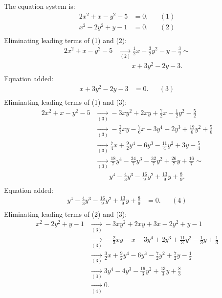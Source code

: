 {\scriptsize
The equation system is:
\begin{align*}
2x^{2}+x-y^{2}-5&= 0, &&(1)\\
x^{2}-2y^{2}+y-1&= 0. &&(2)\\
\end{align*}
Eliminating leading terms of (1) and (2):
\begin{align*}
2x^{2}+x-y^{2}-5&\underset{(2)}{\rightarrow}\frac{1}{2}x+\frac{3}{2}y^{2}-y-\frac{3}{2}
\sim \\ &\qquad x+3y^{2}-2y-3
.\\ \end{align*}
Equation added:
\begin{align*}
x+3y^{2}-2y-3&= 0. &&(3)\\
\end{align*}
Eliminating leading terms of (1) and (3):
\begin{align*}
2x^{2}+x-y^{2}-5&\underset{(3)}{\rightarrow}-3xy^{2}+2xy+\frac{7}{2}x-\frac{1}{2}y^{2}-\frac{5}{2}
\\ &\underset{(3)}{\rightarrow}-\frac{2}{3}xy-\frac{7}{6}x-3y^{4}+2y^{3}+\frac{19}{6}y^{2}+\frac{5}{6}
\\ &\underset{(3)}{\rightarrow}\frac{7}{4}x+\frac{9}{2}y^{4}-6y^{3}-\frac{11}{4}y^{2}+3y-\frac{5}{4}
\\ &\underset{(3)}{\rightarrow}\frac{18}{7}y^{4}-\frac{24}{7}y^{3}-\frac{32}{7}y^{2}+\frac{26}{7}y+\frac{16}{7}
\sim \\ &\qquad y^{4}-\frac{4}{3}y^{3}-\frac{16}{9}y^{2}+\frac{13}{9}y+\frac{8}{9}
.\\ \end{align*}
Equation added:
\begin{align*}
y^{4}-\frac{4}{3}y^{3}-\frac{16}{9}y^{2}+\frac{13}{9}y+\frac{8}{9}&= 0. &&(4)\\
\end{align*}
Eliminating leading terms of (2) and (3):
\begin{align*}
x^{2}-2y^{2}+y-1&\underset{(3)}{\rightarrow}-3xy^{2}+2xy+3x-2y^{2}+y-1
\\ &\underset{(3)}{\rightarrow}-\frac{2}{3}xy-x-3y^{4}+2y^{3}+\frac{11}{3}y^{2}-\frac{1}{3}y+\frac{1}{3}
\\ &\underset{(3)}{\rightarrow}\frac{3}{2}x+\frac{9}{2}y^{4}-6y^{3}-\frac{7}{2}y^{2}+\frac{7}{2}y-\frac{1}{2}
\\ &\underset{(3)}{\rightarrow}3y^{4}-4y^{3}-\frac{16}{3}y^{2}+\frac{13}{3}y+\frac{8}{3}
\\ &\underset{(4)}{\rightarrow}0
.\\ \end{align*}
}
